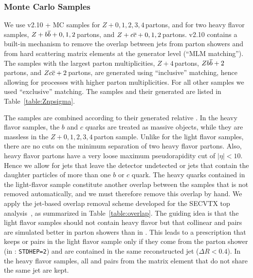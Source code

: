 
\subsubsection{Monte Carlo Samples}
We use \alp v2.10 + \pyth MC samples for $Z+0,1,2,3,4$\,partons, and
for two heavy flavor samples, $Z+{b\overline{b}}+0,1,2$\,partons, and
$Z+{c\overline{c}}+0,1,2$\,partons. \alp v2.10 contains a built-in
mechanism to remove the overlap between jets from parton showers and
from hard scattering matrix elements at the generator level (``MLM
matching''). The samples with the largest parton multiplicities, \ie
$Z+4$\,partons, $Z{b\overline{b}}+2$\,partons, and $Z{c\overline{c}}+2$\,partons, are
generated using ``inclusive'' matching, hence allowing for processes
with higher parton multiplicities. For all other samples we used
``exclusive'' matching. The samples and their generated \xsects are
listed in Table~\ref{table:Znpsigma}.

The samples are combined according to their generated relative
\xsects.  In the heavy flavor samples, the $b$ and $c$ quarks are
treated as massive objects, while they are massless in the $Z+0,1,
2,3,4$\,parton sample. Unlike for the light flavor samples, there are
no cuts on the minimum separation of two heavy flavor partons. Also, 
heavy flavor partons have a very loose maximum pseudorapidity cut of 
$|\eta|<10$.  Hence we allow for jets that leave the detector undetected 
or jets that contain the daughter particles of more than one $b$ or $c$ quark.  
The heavy quarks contained in the light-flavor sample constitute another overlap
between the samples that is not removed automatically, and we must therefore
remove this overlap by hand. We apply the jet-based
overlap removal scheme developed for the SECVTX top
\xsect analysis~\cite{CDF8767}, as summarized in Table~\ref{table:overlap}.
The guiding idea is that the light flavor samples should not contain
heavy flavor but that collinear \bbbar and \ccbar pairs are simulated
better in \pyth parton showers than in \alp. This leads to a
prescription that keeps \bbbar or \ccbar pairs in the light flavor
sample only if they come from the parton shower (in \pyth: \texttt{STDHEP=2})
and are contained in the same reconstructed jet ($\Delta R<0.4$). In
the heavy flavor samples, all \bbbar and \ccbar pairs from the matrix element
that do not share the same jet are kept.

